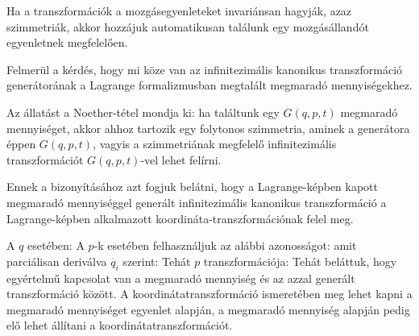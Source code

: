    Ha a transzformációk a mozgásegyenleteket invariánsan hagyják, azaz szimmetriák, akkor hozzájuk automatikusan találunk egy mozgásállandót  egyenletnek megfelelően.
  
   Felmerül a kérdés, hogy mi köze van az infinitezimális kanonikus transzformáció generátorának a Lagrange formalizmusban megtalált megmaradó mennyiségekhez.
   
   Az állatást a Noether-tétel mondja ki: ha találtunk egy $G(q,p,t)$ megmaradó mennyiséget, akkor ahhoz tartozik egy folytonos szimmetria, aminek a generátora éppen $G(q,p,t)$, vagyis a szimmetriának megfelelő infinitezimális transzformációt $G(q,p,t)$-vel lehet felírni.
   
   Ennek a bizonyításához azt fogjuk belátni, hogy a Lagrange-képben kapott megmaradó mennyiséggel generált infinitezimális kanonikus transzformáció a Lagrange-képben alkalmazott koordináta-transzformációnak felel meg. 
   
   A $q$ esetében:
   A $p$-k esetében felhasználjuk az alábbi azonosságot:
   amit parciálisan deriválva $\dot{q_i}$ szerint:
   Tehát $p$ transzformációja:
   Tehát beláttuk, hogy egyértelmű kapcsolat van a megmaradó mennyiség és az azzal generált transzformáció között. A koordinátatranszformáció ismeretében meg lehet kapni a megmaradó mennyiséget  egyenlet alapján, a megmaradó mennyiség alapján pedig elő lehet állítani a koordinátatranszformációt. 
   
